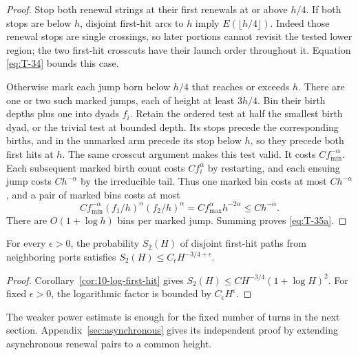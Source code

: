 \begin{proof}
Stop both renewal strings at their first renewals at or above \(h/4\).
If both stops are below \(h\), disjoint first-hit arcs to \(h\) imply
\(E(\lfloor h/4\rfloor)\). Indeed those renewal stops are single
crossings, so later portions cannot revisit the tested lower region;
the two first-hit crosscuts have their launch order throughout it.
Equation \eqref{eq:T-34} bounds this case.

Otherwise mark each jump born below \(h/4\) that reaches or exceeds
\(h\). There are one or two such marked jumps, each of height at least
\(3h/4\). Bin their birth depths plus one into dyads \(f_i\). Retain
the ordered test at half the smallest birth dyad, or the trivial test
at bounded depth. Its stops precede the corresponding births, and in
the unmarked arm precede its stop below \(h\), so they precede both
first hits at \(h\). The same crosscut argument makes this test valid.
It costs \(Cf_{\min}^{-\alpha}\). Each subsequent marked birth count
costs \(Cf_i^\alpha\) by restarting, and each ensuing jump costs
\(Ch^{-\alpha}\) by the irreducible tail. Thus one marked bin costs
at most \(Ch^{-\alpha}\), and a pair of marked bins costs at most
\[
 C f_{\min}^{-\alpha}(f_1/h)^\alpha(f_2/h)^\alpha
 =C f_{\max}^\alpha h^{-2\alpha}\le Ch^{-\alpha}.
\]
There are \(O(1+\log h)\) bins per marked jump. Summing proves
\eqref{eq:T-35a}.
\end{proof}

\begin{corollary}\label{09_fast_paths:adjacent-arms}
For every \(\epsilon>0\), the probability \(S_2(H)\) of disjoint
first-hit paths from neighboring ports satisfies
\(S_2(H)\le C_\epsilon H^{-3/4+\epsilon}\).
\end{corollary}
\begin{proof}
Corollary~\ref{cor:10-log-first-hit} gives
\(S_2(H)\le CH^{-3/4}(1+\log H)^2\). For fixed \(\epsilon>0\),
the logarithmic factor is bounded by \(C_\epsilon H^\epsilon\).
\end{proof}
The weaker power estimate is enough for the fixed number of turns in the
next section. Appendix~\ref{sec:asynchronous} gives its independent proof
by extending asynchronous renewal pairs to a common height.
